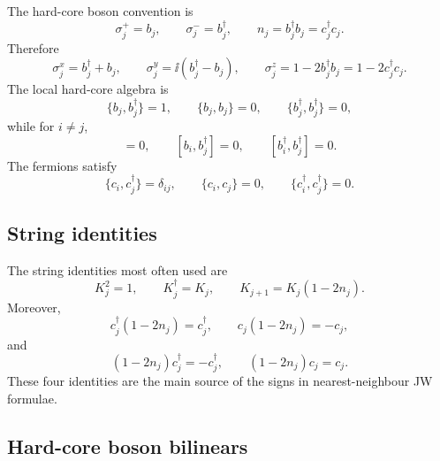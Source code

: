 The hard-core boson convention is
\begin{equation}
    \sigma_j^+=b_j,
    \qquad
    \sigma_j^-=b_j^\dagger,
    \qquad
    n_j=b_j^\dagger b_j=c_j^\dagger c_j.
\end{equation}
Therefore
\begin{equation}
    \sigma_j^x=b_j^\dagger+b_j,
    \qquad
    \sigma_j^y=\ii(b_j^\dagger-b_j),
    \qquad
    \sigma_j^z=1-2b_j^\dagger b_j=1-2c_j^\dagger c_j.
\end{equation}
The local hard-core algebra is
\begin{equation}
    \{b_j,b_j^\dagger\}=1,
    \qquad
    \{b_j,b_j\}=0,
    \qquad
    \{b_j^\dagger,b_j^\dagger\}=0,
\end{equation}
while for \(i\neq j\),
\begin{equation}
    [b_i,b_j]=0,
    \qquad
    [b_i,b_j^\dagger]=0,
    \qquad
    [b_i^\dagger,b_j^\dagger]=0.
\end{equation}
The fermions satisfy
\begin{equation}
    \{c_i,c_j^\dagger\}=\delta_{ij},
    \qquad
    \{c_i,c_j\}=0,
    \qquad
    \{c_i^\dagger,c_j^\dagger\}=0.
\end{equation}

\subsection*{String identities}

The string identities most often used are
\begin{equation}
    K_j^2=1,
    \qquad
    K_j^\dagger=K_j,
    \qquad
    K_{j+1}=K_j(1-2n_j).
\end{equation}
Moreover,
\begin{equation}
    c_j^\dagger(1-2n_j)=c_j^\dagger,
    \qquad
    c_j(1-2n_j)=-c_j,
\end{equation}
and
\begin{equation}
    (1-2n_j)c_j^\dagger=-c_j^\dagger,
    \qquad
    (1-2n_j)c_j=c_j.
\end{equation}
These four identities are the main source of the signs in nearest-neighbour JW
formulae.

\subsection*{Hard-core boson bilinears}

